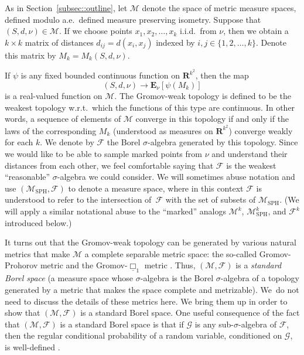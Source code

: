 \documentclass[JEP,XML,SOM,Unicode]{cedram}
\let\mathcal\mathscr
\theoremstyle{plain}
\numberwithin{theorem}{section}
\theoremstyle{definition}
\newcommand{\CG}{{\mathcal G}}
\newcommand\gmsspace{{\mathcal M}_{\mathrm{SPH}}}
\newcommand\mmspace{{\mathcal M}}
\newcommand\mmsigma{{\mathcal F}}
\newcommand \E {{\mathbf E}}
\newcommand{\R}{\mathbf{R}}
\begin{document}
As in Section~\ref{subsec::outline}, let $\mmspace$ denote the space of metric measure spaces, defined modulo a.e.\ defined measure preserving isometry. Suppose that $(S, d, \nu)\in \mmspace$. If we choose points $x_1, x_2, \ldots, x_k$ i.i.d.\ from $\nu$, then we obtain a $k \times k$ matrix of distances $d_{ij} = d(x_i, x_j)$ indexed by $i,j \in \{1,2,\ldots,k\}$. Denote this matrix by $M_k= M_k(S,d,\nu)$.

If $\psi$ is any fixed bounded continuous function on $\R^{k^2}$, then the map
\[
(S,d,\nu) \to \E_\nu [\psi(M_k)]
\]
is a real-valued function on $\mmspace$. The Gromov-weak topology is defined to be the weakest topology w.r.t.\ which the functions of this type are continuous. In other words, a sequence of elements of $\mmspace$ converge in this topology if and only if the laws of the corresponding $M_k$ (understood as measures on $\R^{k^2}$) converge weakly for each $k$. We denote by $\mmsigma$ the Borel $\sigma$-algebra generated by this topology. Since we would like to be able to sample marked points from $\nu$ and understand their distances from each other, we feel comfortable saying that $\mmsigma$ is the weakest ``reasonable'' $\sigma$-algebra we could consider. We will sometimes abuse notation and use $(\gmsspace, \mmsigma)$ to denote a measure space, where in this context $\mmsigma$ is understood to refer to the intersection of~$\mmsigma$ with the set of subsets of $\gmsspace$. (We will apply a similar notational abuse to the ``marked'' analogs $\mmspace^k$, $\gmsspace^k$, and $\mmsigma^k$ introduced below.)

It turns out that the Gromov-weak topology can be generated by various natural metrics that make $\mmspace$ a complete separable metric space: the so-called Gromov-Prohorov metric and the Gromov-$\underline \Box_1$ metric \cite{grevenpfaffelhuberwinter, gromovprohorovandgromovbox}. Thus, $(\mmspace, \mmsigma)$ is a \emph{standard Borel space} (\ie a measure space whose $\sigma$-algebra is the Borel $\sigma$-algebra of a topology generated by a metric that makes the space complete and metrizable). We~do not need to discuss the details of these metrics here. We bring them up in order to show that $(\mmspace, \mmsigma)$ is a standard Borel space. One useful consequence of the fact that $(\mmspace, \mmsigma)$ is a standard Borel space is that if $\CG$ is any sub-$\sigma$-algebra of $\mmsigma$, then the regular conditional probability of a random variable, conditioned on $\CG$, is well-defined \cite[Chap.\,5.1.3]{durrettprobtext}.
\end{document}
